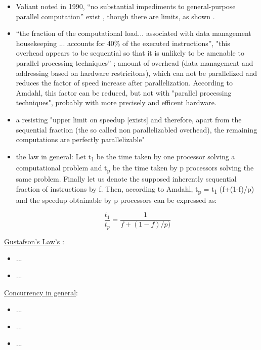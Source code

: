 \begin{itemize}
\item Valiant noted in 1990, “no substantial impediments to general-purpose parallel
computation” exist \parencite[see][p85]{inbook1}, though there are limits, as shown \parencite[seein Sec. 10][p85]{inbook1}.
\item “the fraction of the computational load... associated with data management housekeeping ... accounts for 40\% of the executed instructions”, "this overhead appears to be sequential so that it is unlikely to be amenable to parallel processing techniques” \parencite[see][p80]{inbook1}; amount of overhead (data management and addressing based on hardware restricitons), which can not be parallelized and reduces the factor of speed increase after parallelization. According to Amdahl, this factor can be reduced, but not with "parallel processing techniques", probably with more precisely and efficent hardware.
\item a resisting "upper limit on speedup [exists] and therefore, apart from the sequential fraction (the so called non parallelizabled overhead), the remaining computations are perfectly parallelizable" \parencite[see][p81]{inbook1}
\item the law in general: Let t\textsubscript{1} be the time taken by one processor solving a computational problem and t\textsubscript{p} be the time taken by p processors solving the same problem. Finally let us denote the supposed inherently sequential fraction of instructions by f. Then, according to Amdahl, t\textsubscript{p} = t\textsubscript{1} (f+(1-f)/p) and the speedup obtainable by p processors can be expressed as:

	
\[ \frac{t_1}{t_p} = \frac{1}{f + (1 - f) / p)} \]
\end{itemize}

\underline{Gustafson’s Law's} \parencite{inbook1}:
\begin{itemize}
	\item ...\parencite[see][p81]{inbook1}
	\item ...\parencite[see][p87]{inbook1}\\
\end{itemize}

\underline{Concurrency in general}:
\begin{itemize}
	\item ...\parencite[see][p3]{internet1}
	\item ...\parencite[see][p3]{internet2}
	\item ...
\end{itemize}

